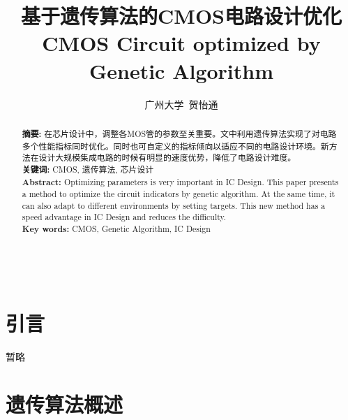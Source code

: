 \documentclass[14pt, a4paper]{article}
\begin{document}
\title{\textbf{基于遗传算法的CMOS电路设计优化\\CMOS Circuit optimized by Genetic Algorithm}}
\author{广州大学\ 贺怡通}
\maketitle

\begin{abstract}
    \noindent
    \textbf{摘要: }在芯片设计中，调整各MOS管的参数至关重要。文中利用遗传算法实现了对电路多个性能指标同时优化。同时也可自定义的指标倾向以适应不同的电路设计环境。新方法在设计大规模集成电路的时候有明显的速度优势，降低了电路设计难度。\\
    \textbf{关键词: }CMOS, 遗传算法, 芯片设计 \\
    
    \noindent
    \textbf{Abstract: }Optimizing parameters is very important in IC Design. This paper presents a method to optimize the circuit indicators by genetic algorithm. At the same time, it can also adapt to different environments by setting targets. This new method has a speed advantage in IC Design and reduces the difficulty. \\
    \textbf{Key words:} CMOS, Genetic Algorithm, IC Design \\ \\ \\ \\ %
    
\end{abstract}

\begin{multicols}{2}
    \tableofcontents
\end{multicols}

\twocolumn

\section{引言}
暂略

\section{遗传算法概述}
\end{document}
